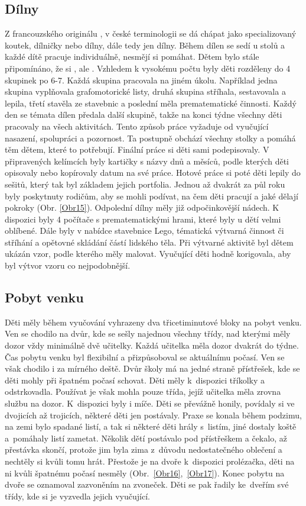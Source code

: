 		\subsection{Dílny}
		\label{dilny}
			Z francouzského originálu , v české terminologii se dá chápat jako specializovaný koutek, dílničky nebo dílny, dále tedy jen dílny. 
			Během dílen se sedí u stolů a každé dítě pracuje individuálně, nesmějí si pomáhat. Dětem bylo stále připomínáno, že si , ale . Vzhledem k vysokému počtu byly děti rozděleny do 4 skupinek po 6-7. Každá skupina pracovala na jiném úkolu. Například jedna skupina vyplňovala grafomotorické listy, druhá skupina stříhala, sestavovala a lepila, třetí stavěla ze stavebnic a poslední měla prematematické činnosti. Každý den se témata dílen předala další skupině, takže na konci týdne všechny děti pracovaly na všech aktivitách. Tento způsob práce vyžaduje od vyučující nasazení, spolupráci a pozornost. Ta postupně obchází všechny stolky a pomáhá těm dětem, které to potřebují. Finální práce si děti sami podepisovaly. V připravených kelímcích byly kartičky s názvy dnů a měsíců, podle kterých děti opisovaly nebo kopírovaly datum na své práce. Hotové práce si poté děti lepily do sešitů, který tak byl základem jejich portfolia. Jednou až dvakrát za půl roku byly poskytnuty rodičům, aby se mohli podívat, na čem děti pracují a jaké dělají pokroky (Obr. \ref{Obr15}). Odpolední dílny měly již odpočinkovější nádech. K dispozici byly 4 počítače s prematematickými hrami, které byly u dětí velmi oblíbené. Dále byly v nabídce stavebnice Lego, tématická výtvarná činnost či stříhání a opětovné skládání částí lidského těla. Při výtvarné aktivitě byl dětem ukázán vzor, podle kterého měly malovat. Vyučující děti hodně korigovala, aby byl výtvor vzoru co nejpodobnější.


		\subsection{Pobyt venku}
		\label{prestavka}
			Děti měly během vyučování vyhrazeny dva třicetiminutové bloky na pobyt venku. Ven se chodilo na dvůr, kde se sešly najednou všechny třídy, nad kterými měly dozor vždy minimálně dvě učitelky. Každá učitelka měla dozor dvakrát do týdne. Čas pobytu venku byl flexibilní a přizpůsoboval se aktuálnímu počasí. Ven se však chodilo i za mírného deště. Dvůr školy má na jedné straně přístřešek, kde se děti mohly při špatném počasí schovat. Děti měly k dispozici tříkolky a odstrkovadla. Používat je však mohla pouze třída, jejíž učitelka měla zrovna službu na dozor. K dispozici byly i míče. Děti se převážně honily, povídaly si ve dvojicích až trojicích, některé děti jen postávaly. Praxe se konala během podzimu, na zemi bylo spadané listí, a tak si některé děti hrály s listím, jiné dostaly koště a pomáhaly listí zametat. Několik dětí postávalo pod přístřeškem a čekalo, až přestávka skončí, protože jim byla zima z důvodu nedostatečného oblečení a nechtěly si kvůli tomu hrát. Přestože je na dvoře k dispozici prolézačka, děti na ni kvůli špatnému počasí nesměly (Obr.~\ref{Obr16},~\ref{Obr17}). 
			Konec pobytu na dvoře se oznamoval zazvoněním na zvoneček. Děti se pak řadily ke dveřím své třídy, kde si je vyzvedla jejich vyučující. 

